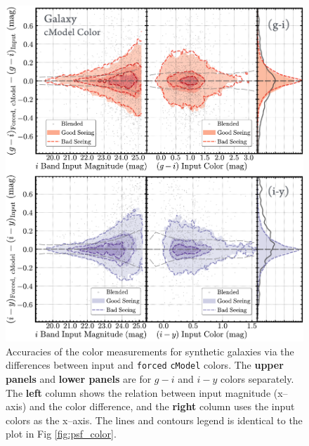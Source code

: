\documentclass[useamsfonts]{pasj01}
\def\cmodel{\texttt{cModel}}
\def\forced{\texttt{forced}}
\begin{document}
\begin{figure}
    \begin{center}
        \includegraphics[width=15cm]{fig/synpipe_galaxy_color}
    \end{center}
    \caption{
        Accuracies of the color measurements for synthetic galaxies via the
        differences between input and \forced{} \cmodel{} colors.
        The \textbf{upper panels} and \textbf{lower panels} are for $g-i$ and $i-y$
        colors separately.
        The \textbf{left} column shows the relation between input magnitude (x--axis) and
        the color difference, and the \textbf{right} column uses the input colors as
        the x--axis.
        The lines and contours legend is identical to the plot in 
        Fig \ref{fig:psf_color}.
        }
    \label{fig:cmodel_color}
\end{figure}
\end{document}
